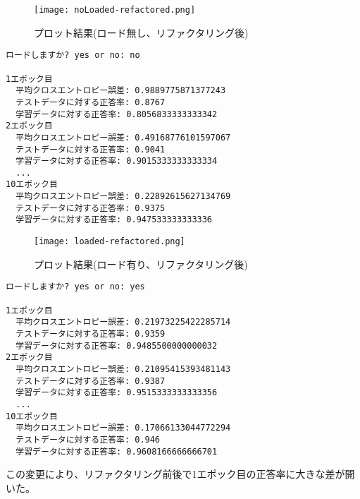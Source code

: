 \documentclass[11px,a4,dvipdfmx]{jsarticle}
\begin{document}
 \begin{figure}[H]
		      \begin{center}
			      \texttt{[image: noLoaded-refactored.png]}
			      \caption{プロット結果(ロード無し、リファクタリング後)}
		      \end{center}
\end{figure}
\begin{verbatim}
ロードしますか? yes or no: no

1エポック目
  平均クロスエントロピー誤差: 0.9889775871377243
  テストデータに対する正答率: 0.8767
  学習データに対する正答率: 0.8056833333333342
2エポック目
  平均クロスエントロピー誤差: 0.49168776101597067
  テストデータに対する正答率: 0.9041
  学習データに対する正答率: 0.9015333333333334
  ...
10エポック目
  平均クロスエントロピー誤差: 0.22892615627134769
  テストデータに対する正答率: 0.9375
  学習データに対する正答率: 0.947533333333336
\end{verbatim}
 \begin{figure}[H]
		      \begin{center}
			      \texttt{[image: loaded-refactored.png]}
			      \caption{プロット結果(ロード有り、リファクタリング後)}
		      \end{center}
\end{figure}
\begin{verbatim}
ロードしますか? yes or no: yes

1エポック目
  平均クロスエントロピー誤差: 0.21973225422285714
  テストデータに対する正答率: 0.9359
  学習データに対する正答率: 0.9485500000000032
2エポック目
  平均クロスエントロピー誤差: 0.21095415393481143
  テストデータに対する正答率: 0.9387
  学習データに対する正答率: 0.9515333333333356
  ...
10エポック目
  平均クロスエントロピー誤差: 0.17066133044772294
  テストデータに対する正答率: 0.946
  学習データに対する正答率: 0.9608166666666701
\end{verbatim}
この変更により、リファクタリング前後で1エポック目の正答率に大きな差が開いた。
\end{document}
